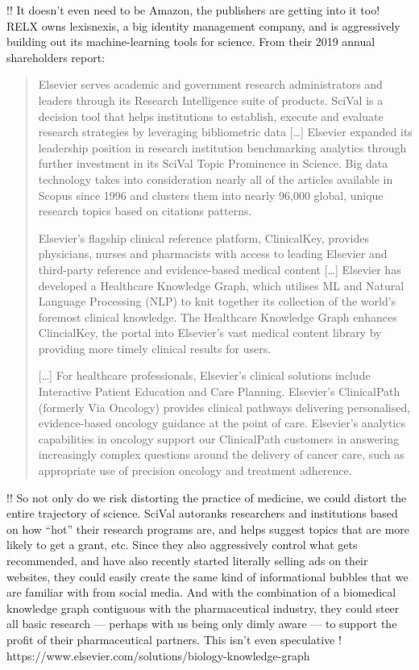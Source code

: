 \documentclass[notoc]{tufte-book}
\begin{document}
!! It doesn't even need to be Amazon, the publishers are getting into it
too! RELX owns lexisnexis, a big identity management company, and is
aggressively building out its machine-learning tools for science. From
their 2019 annual shareholders report:

\begin{quote}
Elsevier serves academic and government research administrators and
leaders through its Research Intelligence suite of products. SciVal is a
decision tool that helps institutions to establish, execute and evaluate
research strategies by leveraging bibliometric data {[}\ldots{]}
Elsevier expanded its leadership position in research institution
benchmarking analytics through further investment in its SciVal Topic
Prominence in Science. Big data technology takes into consideration
nearly all of the articles available in Scopus since 1996 and clusters
them into nearly 96,000 global, unique research topics based on
citations patterns.

Elsevier's flagship clinical reference platform, ClinicalKey, provides
physicians, nurses and pharmacists with access to leading Elsevier and
third-party reference and evidence-based medical content {[}\ldots{]}
Elsevier has developed a Healthcare Knowledge Graph, which utilises ML
and Natural Language Processing (NLP) to knit together its collection of
the world's foremost clinical knowledge. The Healthcare Knowledge Graph
enhances ClincialKey, the portal into Elsevier's vast medical content
library by providing more timely clinical results for users.

{[}\ldots{]} For healthcare professionals, Elsevier's clinical solutions
include Interactive Patient Education and Care Planning. Elsevier's
ClinicalPath (formerly Via Oncology) provides clinical pathways
delivering personalised, evidence-based oncology guidance at the point
of care. Elsevier's analytics capabilities in oncology support our
ClinicalPath customers in answering increasingly complex questions
around the delivery of cancer care, such as appropriate use of precision
oncology and treatment adherence.
\end{quote}

!! So not only do we risk distorting the practice of medicine, we could
distort the entire trajectory of science. SciVal autoranks researchers
and institutions based on how ``hot'' their research programs are, and
helps suggest topics that are more likely to get a grant, etc. Since
they also aggressively control what gets recommended, and have also
recently started literally selling ads on their websites, they could
easily create the same kind of informational bubbles that we are
familiar with from social media. And with the combination of a
biomedical knowledge graph contiguous with the pharmaceutical industry,
they could steer all basic research --- perhaps with us being only dimly
aware --- to support the profit of their pharmaceutical partners. This
isn't even speculative !
https://www.elsevier.com/solutions/biology-knowledge-graph
\end{document}
